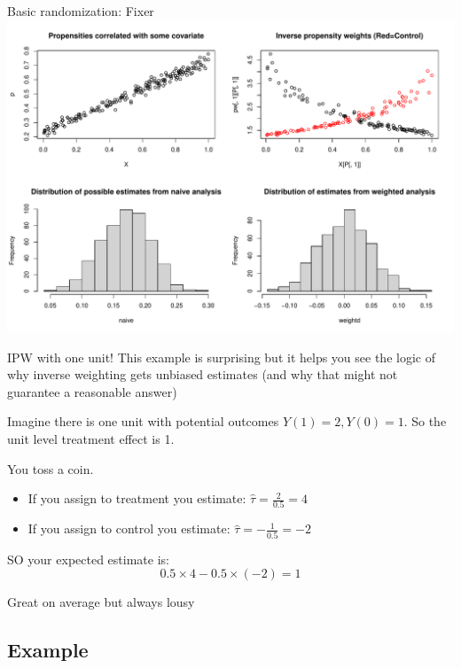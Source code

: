 \documentclass[
  11pt,
  ignorenonframetext,
]{beamer}
\providecommand{\tightlist}{%
  \setlength{\itemsep}{0pt}\setlength{\parskip}{0pt}}\usepackage{longtable,booktabs,array}
\begin{document}
\begin{frame}{Basic randomization: Fixer}
\protect\hypertarget{basic-randomization-fixer-1}{}
\includegraphics{0_lectures_files/figure-beamer/unnamed-chunk-281-1.pdf}
\end{frame}

\begin{frame}{IPW with one unit!}
\protect\hypertarget{ipw-with-one-unit}{}
This example is surprising but it helps you see the logic of why inverse
weighting gets unbiased estimates (and why that might not guarantee a
reasonable answer)

Imagine there is one unit with potential outcomes
\(Y(1) = 2, Y(0) = 1\). So the unit level treatment effect is 1.

You toss a coin.

\begin{itemize}
\tightlist
\item
  If you assign to treatment you estimate:
  \(\hat\tau = \frac{2}{0.5} = 4\)
\item
  If you assign to control you estimate:
  \(\hat\tau = -\frac{1}{0.5} = -2\)
\end{itemize}

SO your expected estimate is: \[0.5 \times 4 - 0.5 \times (-2) = 1\]

Great on average but always lousy
\end{frame}

\hypertarget{example}{%
\subsection{Example}\label{example}}
\end{document}
